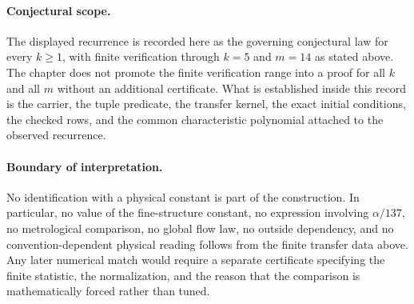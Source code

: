 \paragraph{Conjectural scope.}
The displayed recurrence is recorded here as the governing conjectural law for every $k\geq 1$, with finite verification through $k=5$ and $m=14$ as stated above.  The chapter does not promote the finite verification range into a proof for all $k$ and all $m$ without an additional certificate.  What is established inside this record is the carrier, the tuple predicate, the transfer kernel, the exact initial conditions, the checked rows, and the common characteristic polynomial attached to the observed recurrence.

\paragraph{Boundary of interpretation.}
No identification with a physical constant is part of the construction.  In particular, no value of the fine-structure constant, no expression involving $\alpha/137$, no metrological comparison, no global flow law, no outside dependency, and no convention-dependent physical reading follows from the finite transfer data above.  Any later numerical match would require a separate certificate specifying the finite statistic, the normalization, and the reason that the comparison is mathematically forced rather than tuned.
